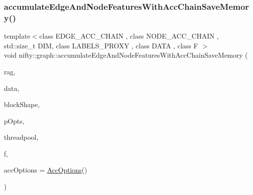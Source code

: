 \subsubsection{\texorpdfstring{accumulate\+Edge\+And\+Node\+Features\+With\+Acc\+Chain\+Save\+Memory()}{accumulateEdgeAndNodeFeaturesWithAccChainSaveMemory()}}
{\footnotesize\ttfamily template$<$class E\+D\+G\+E\+\_\+\+A\+C\+C\+\_\+\+C\+H\+A\+IN , class N\+O\+D\+E\+\_\+\+A\+C\+C\+\_\+\+C\+H\+A\+IN , std\+::size\+\_\+t D\+IM, class L\+A\+B\+E\+L\+S\+\_\+\+P\+R\+O\+XY , class D\+A\+TA , class F $>$ \\
void nifty\+::graph\+::accumulate\+Edge\+And\+Node\+Features\+With\+Acc\+Chain\+Save\+Memory (\begin{DoxyParamCaption}\item[{const \hyperlink{classnifty_1_1graph_1_1GridRag}{Grid\+Rag}$<$ D\+IM, L\+A\+B\+E\+L\+S\+\_\+\+P\+R\+O\+XY $>$ \&}]{rag,  }\item[{const D\+A\+TA \&}]{data,  }\item[{const \hyperlink{namespacenifty_1_1array_a683f151f19c851754e0c6d55ed16a0c2}{array\+::\+Static\+Array}$<$ int64\+\_\+t, D\+IM $>$ \&}]{block\+Shape,  }\item[{const \hyperlink{classnifty_1_1parallel_1_1ParallelOptions}{parallel\+::\+Parallel\+Options} \&}]{p\+Opts,  }\item[{\hyperlink{classnifty_1_1parallel_1_1ThreadPool}{parallel\+::\+Thread\+Pool} \&}]{threadpool,  }\item[{F \&\&}]{f,  }\item[{const \hyperlink{structnifty_1_1graph_1_1AccOptions}{Acc\+Options} \&}]{acc\+Options = {\ttfamily \hyperlink{structnifty_1_1graph_1_1AccOptions}{Acc\+Options}()} }\end{DoxyParamCaption})}

\mbox{\label{namespacenifty_1_1graph_a367cdb1cc5ac050b60098dc22effd452}} 
